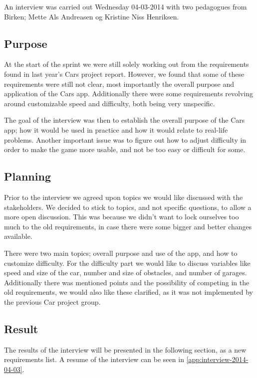 An interview was carried out Wednesday 04-03-2014 with two pedagogues from Birken; Mette Als Andreasen og Kristine Niss Henriksen.

\subsection{Purpose}
At the start of the sprint we were still solely working out from the requirements found in last year's Cars project report.
However, we found that some of these requirements were still not clear, most importantly the overall purpose and application of the Cars app.
Additionally there were some requirements revolving around customizable speed and difficulty, both being very unspecific.

The goal of the interview was then to establish the overall purpose of the Cars app; how it would be used in practice and how it would relate to real-life problems.
Another important issue was to figure out how to adjust difficulty in order to make the game more usable, and not be too easy or difficult for some.

\subsection{Planning}
Prior to the interview we agreed upon topics we would like discussed with the stakeholders.
We decided to stick to topics, and not specific questions, to allow a more open discussion.
This was because we didn't want to lock ourselves too much to the old requirements, in case there were some bigger and better changes available.

There were two main topics; overall purpose and use of the app, and how to customize difficulty.
For the difficulty part we would like to discuss variables like speed and size of the car, number and size of obstacles, and number of garages.
Additionally there was mentioned points and the possibility of competing in the old requirements, we would also like these clarified, as it was not implemented by the previous Car project group.

\subsection{Result}
The results of the interview will be presented in the following section, as a new requirements list.
A resume of the interview can be seen in \ref{app:interview-2014-04-03}.
